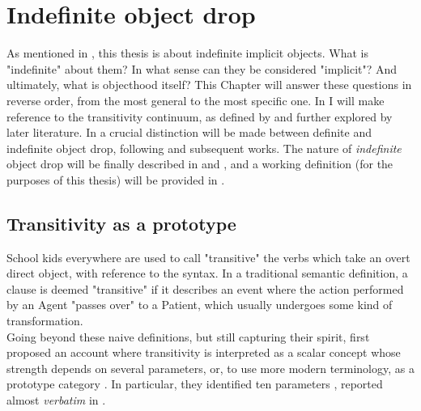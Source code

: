 \setchapterpreamble[u]{\margintoc}
\chapter{Indefinite object drop} %

As mentioned in , this thesis is about indefinite implicit objects. What is "indefinite" about them? In what sense can they be considered "implicit"? And ultimately, what is objecthood itself? This Chapter will answer these questions in reverse order, from the most general to the most specific one. In  I will make reference to the transitivity continuum, as defined by \textcite{HopperThompson1980} and further explored by later literature. In  a crucial distinction will be made between definite and indefinite object drop, following \textcite{Fillmore1986} and subsequent works. The nature of \textit{indefinite} object drop will be finally described in  and , and a working definition (for the purposes of this thesis) will be provided in .

\section{Transitivity as a prototype} 

School kids everywhere are used to call "transitive" the verbs which take an overt direct object, with reference to the syntax. In a traditional semantic definition, a clause is deemed "transitive" if it describes an event where the action performed by an Agent "passes over" to a Patient, which usually undergoes some kind of transformation.\\
Going beyond these naive definitions, but still capturing their spirit, \textcite{HopperThompson1980} first proposed an account where transitivity is interpreted as a scalar concept whose strength depends on several parameters, or, to use more modern terminology, as a prototype category \parencite{Naess2007}. In particular, they identified ten parameters \parencite[252]{HopperThompson1980}, reported almost \textit{verbatim} in .

